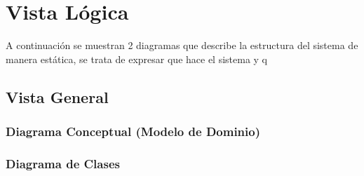 \section{Vista Lógica} \label{vistaLogica}
A continuación se muestran 2 diagramas que describe la estructura del sistema de manera estática, se trata de expresar que hace el sistema y q
    \subsection{Vista General}

    \subsubsection{Diagrama Conceptual (Modelo de Dominio)}
    \subsubsection{Diagrama de Clases}